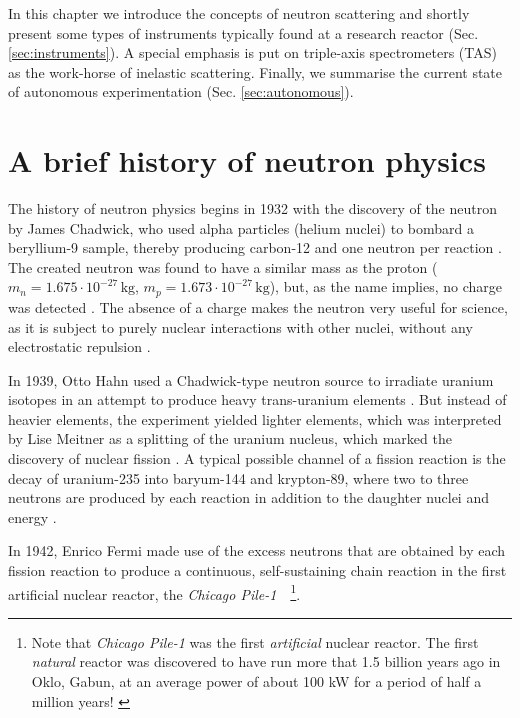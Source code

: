 %
%

In this chapter we introduce the concepts of neutron scattering and shortly present some types of instruments typically found at a research reactor (Sec. \ref{sec:instruments}). A special emphasis is put on triple-axis spectrometers (TAS) as the work-horse of inelastic scattering. Finally, we summarise the current state of autonomous experimentation (Sec. \ref{sec:autonomous}).



\section{A brief history of neutron physics \label{sec:neutrons}}

The history of neutron physics begins in 1932 with the discovery of the neutron by James Chadwick, who used alpha particles (helium nuclei) to bombard a beryllium-9 sample, thereby producing carbon-12 and one neutron per reaction \cite[p. 1]{Jacrot2021}. The created neutron was found to have a similar mass as the proton ($m_n = 1.675\cdot10^{-27}\,\mathrm{kg}$, $m_p = 1.673\cdot10^{-27}\,\mathrm{kg}$), but, as the name implies, no charge was detected \cite[p. 2]{Squires2012}. The absence of a charge makes the neutron very useful for science, as it is subject to purely nuclear interactions with other nuclei, without any electrostatic repulsion \cite[p. 1]{Squires2012}.

In 1939, Otto Hahn used a Chadwick-type neutron source to irradiate uranium isotopes in an attempt to produce heavy trans-uranium elements \cite{wiki_fission}. But instead of heavier elements, the experiment yielded lighter elements, which was interpreted by Lise Meitner as a splitting of the uranium nucleus, which marked the discovery of nuclear fission \cite{wiki_fission}. A typical possible channel of a fission reaction is the decay of uranium-235 into baryum-144 and krypton-89, where two to three neutrons are produced by each reaction in addition to the daughter nuclei and energy \cite{wiki_fission}.

In 1942, Enrico Fermi made use of the excess neutrons that are obtained by each fission reaction to produce a continuous, self-sustaining chain reaction in the first artificial nuclear reactor, the \textit{Chicago Pile-1}~\cite[p.1]{Jacrot2021}~\footnote{Note that \textit{Chicago Pile-1} was the first \textit{artificial} nuclear reactor. The first \textit{natural} reactor was discovered to have run more that 1.5 billion years ago in Oklo, Gabun, at an average power of about 100 kW for a period of half a million years! \cite{wiki_oklo}}.

